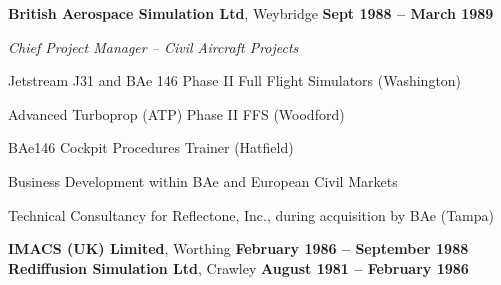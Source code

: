 \documentclass[10pt]{article}
\newenvironment{outerlist}[1][\enskip\textbullet]%
        {\begin{itemize}[#1]}{\end{itemize}%
         \vspace{-.6\baselineskip}}
\newenvironment{innerlist}[1][\enskip\textbullet]%
        {\begin{compactitem}[#1]}{\end{compactitem}}
\newcommand{\blankline}{\quad\pagebreak[2]}
\begin{document}
\blankline

\textbf{British Aerospace Simulation Ltd}, Weybridge        \hfill \textbf{Sept 1988 -- March 1989}

\begin{innerlist}

\item[] \textit{Chief Project Manager -- Civil Aircraft Projects}%
\begin{innerlist}
\item Jetstream J31 and BAe 146 Phase II Full Flight Simulators (Washington)
\item Advanced Turboprop (ATP) Phase II FFS (Woodford)
\item BAe146 Cockpit Procedures Trainer (Hatfield)
\item Business Development within BAe and European Civil Markets
\item Technical Consultancy for Reflectone, Inc., during acquisition by BAe (Tampa)

\end{innerlist}

\end{innerlist}

\blankline

%
%
%
%
%
%
%

\textbf{IMACS (UK) Limited}, Worthing        \hfill \textbf{February 1986 -- September 1988}
\textbf{Rediffusion Simulation Ltd}, Crawley        \hfill \textbf{August 1981 -- February 1986}
\end{document}
